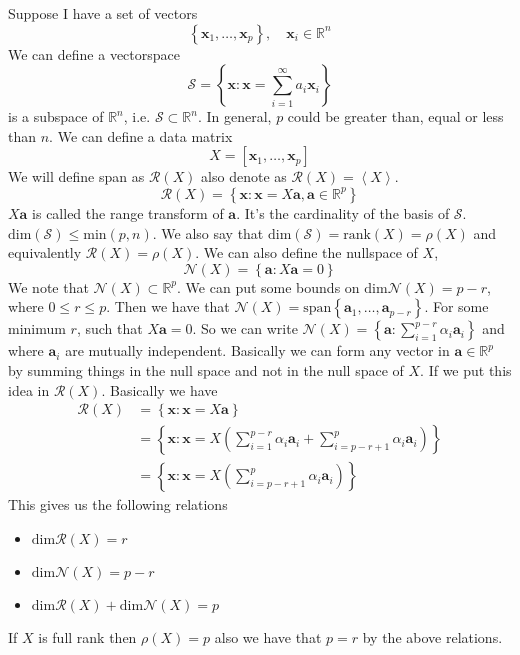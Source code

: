\documentclass[a4paper]{article}
\begin{document}
Suppose I have a set of vectors
\[
    \left\{ \mathbf{x}_1, \dots, \mathbf{x}_p \right\}, \quad \mathbf{x}_i \in \mathds{R}^n
\]
We can define a vectorspace
\[
    \mathcal{S} = \left\{ \mathbf{x} : \mathbf{x} = \sum_{i=1}^{\infty} a_i \mathbf{x}_i \right\}
\]
is a subspace of $\mathds{R}^n$, i.e. $\mathcal{S} \subset \mathds{R}^n$. In general, $p$ could be greater than, equal or less than $n$. We can define a data matrix 
\[
    X = \left[ \mathbf{x}_1, \dots, \mathbf{x}_p \right]
\]
We will define span as $\mathcal{R}(X)$ also denote as $\mathcal{R}(X) = \left< X\right>$. \[
    \mathcal{R}(X) = \left\{ \mathbf{x} : \mathbf{x} = X\mathbf{a}, \mathbf{a} \in \mathds{R}^p \right\}
\]
$X\mathbf{a}$ is called the range transform of $\mathbf{a}$. It's the cardinality of the basis of $\mathcal{S}$. $\text{dim}(\mathcal{S}) \leq \text{min}(p,n)$. We also say that $\text{dim}(\mathcal{S}) = \text{rank}(X) = \rho(X)$ and equivalently $\mathcal{R}(X) = \rho(X)$. We can also define the nullspace of $X$, 
\[
    \mathcal{N}(X) = \left\{ \mathbf{a} : X\mathbf{a} = 0 \right\}
\]
We note that $\mathcal{N}(X) \subset \mathds{R}^p$. We can put some bounds on $\text{dim}\mathcal{N}(X) = p - r$, where $0 \leq r \leq p$. Then we have that $\mathcal{N}(X) = \text{span} \left\{ \mathbf{a}_1, \dots, \mathbf{a}_{p-r} \right\}$.  For some minimum $r$, such that $X\mathbf{a} = 0$. So we can write $\mathcal{N}(X) = \left\{ \mathbf{a} : \sum_{i=1}^{p-r} \alpha_i \mathbf{a}_i \right\}$ and where $\mathbf{a}_i$ are mutually independent. Basically we can form any vector in $\mathbf{a} \in \mathds{R}^p$ by summing things in the null space and not in the null space of $X$. If we put this idea in $\mathcal{R}(X)$. Basically we have
\[
    \begin{aligned}
        \mathcal{R}(X) &= \left\{ \mathbf{x}: \mathbf{x} = X \mathbf{a} \right\} \\
                       &= \left\{ \mathbf{x}: \mathbf{x} = X\left( \sum_{i=1}^{p-r} \alpha_i \mathbf{a}_i + \sum_{i=p-r+1}^{p} \alpha_i \mathbf{a}_i\right) \right\} \\
                       &= \left\{ \mathbf{x}: \mathbf{x} = X\left(\sum_{i=p-r+1}^p \alpha_i \mathbf{a}_i\right) \right\}
    \end{aligned}
\]
This gives us the following relations
\begin{itemize}
    \item $\text{dim}\mathcal{R}(X) = r$
    \item $\text{dim}\mathcal{N}(X) = p-r$
    \item $\text{dim}\mathcal{R}(X) + \text{dim}\mathcal{N}(X) = p$
\end{itemize}
If $X$ is full rank then $\rho(X) = p$ also we have that $p=r$ by the above relations.
\end{document}
